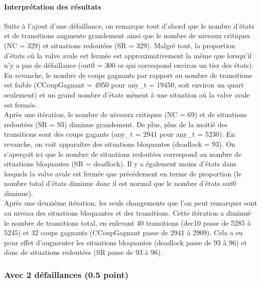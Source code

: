 \documentclass[a4paper]{book}
\begin{document}
\paragraph{Interprétation des résultats}
Suite à l'ajout d'une défaillance, on remarque tout d'abord que le nombre d'états et de transitions augmente grandement ainsi que le nombre 
de niveaux critiques (NC = 329) et situations redoutées (SR = 329). Malgré tout, la proportion d'états où la valve avale est fermée est approximativement 
la même que lorsqu'il n'y a pas de défaillance (out0 = 300 ce qui correspond environ un tier des états). En revanche, le nombre de coups gagnants par rapport 
au nombre de transitions est faible (CCoupGagnant = 4950 pour any\_t = 19450, soit environ un quart seulement) et un grand nombre d'états mènent à une situation où 
la valve avale est fermée. \\
Après une itération, le nombre de niveaux critiques (NC = 69) et de situations redoutées (SR = 93) diminue grandement. De plus, plus de la moitié des transitions 
sont des coups gagants (any\_t = 2941 pour any\_t = 5230). En revanche, on voit apparaître des situations bloquantes (deadlock = 93). On s'aperçoit ici que le nombre 
de situations redoutées correspond au nombre de situations bloquantes (SR = deadlock). Il y a également moins 
d'états dans lesquels la valve avale est fermée que précédement en terme de proportion (le nombre total d'états diminue donc il est normal que le nombre d'états out0 
diminue).\\
Après une deuxième itération, les seuls changements que l'on peut remarquer sont au niveau des situations bloquantes et des transitions. Cette itération a diminué 
le nombre de transitions total, en enlevant 40 transitions (dec10 passe de 5285 à 5245) et 32 coups gagnants (CCoupGagnant passe de 2941 à 2909). Cela a eu pour  
effet d'augmenter les situations bloquantes (deadlock passe de 93 à 96) et donc de situations redoutées (SR passe de 93 à 96).



\subsubsection{Avec 2 défaillances (0.5 point)}





\end{document}
